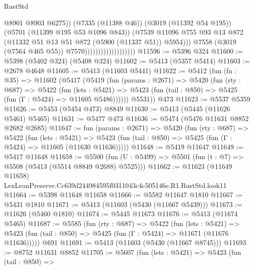 \begin{lexlean}{RustStd}
\begin{coremodule}
                                                @8901
                                                @8903
                                                @6275))
                                            (@7335 (@11388 @46))
                                            (@3019 (@11392 @54 @195))
                                            (@5701 (@11399 @195 @53 @1096 @843))
                                            (@7539
                                              @11096
                                              @755
                                              @93
                                              @13
                                              @872
                                              (@11332 @51 @13 @51 @872 (@5900 (@11337 @51)) @5954)))
                                          @7558
                                          (@3019 (@7564 @465 @55))
                                          @7570)))))))))))))))))))
@11596 := @5396 @324
@11600 := @5398 (@5402 @324) (@5408 @324)
@11602 := @5413 (@5357 @5414)
@11603 := @2678 @4648
@11605 := @5413 (@11603 @5441)
@11622 := @5412
    (fun (fn : @35) =>
    @11602
      (@5417
        (@5419
          (fun (params : @2671) =>
          @5420
            (fun (rty : @687) =>
            @5422
              (fun (lets : @5421) =>
              @5423 (fun (tail : @850) => @5425 (fun (Γ : @5424) => @11605 @5486))))))
        @5531))
    @473
@11623 := @5537 @5359
@11626 := @5453 (@5454 @473) @8849
@11630 := @5413 (@5445 (@11626 @5461) @5465)
@11631 := @5477 @473
@11636 := @5474 (@5476 @11631 @8852 @2682 @2685)
@11647 := fun (params : @2671) =>
  @5420
    (fun (rty : @687) =>
    @5422
      (fun (lets : @5421) =>
      @5423 (fun (tail : @850) => @5425 (fun (Γ : @5424) => @11605 (@11630 @11636)))))
@11648 := @5419 @11647
@11649 := @5417 @11648
@11658 := @5500 (fun (U : @5499) => @5501 (fun (t : @7) => @5508 (@5413 (@5514 @8849 @2688) @5525)))
@11662 := @11623 (@11649 @11658) LexLeanPreserve.Cc639d244984595f0311043c4c505146e.R1.RustStd.look11
@11664 := @5398 @11648 @11658
@11666 := @5582 @11647 @1810
@11667 := @5431 @1810
@11671 := @5413 (@11603 (@5430 (@11667 @5439)))
@11673 := @11626 (@5460 @1810)
@11674 := @5445 @11673
@11676 := @5413 (@11674 @5465)
@11687 := @5585
    (fun (rty : @687) =>
    @5422
      (fun (lets : @5421) =>
      @5423 (fun (tail : @850) => @5425 (fun (Γ : @5424) => @11671 (@11676 @11636)))))
    @691
@11691 := @5413 (@11603 (@5430 (@11667 @8745)))
@11693 := @8752 @11631 @8852
@11705 := @5607
    (fun (lets : @5421) =>
    @5423
      (fun (tail : @850) =>

\end{coremodule}
\end{lexlean}
